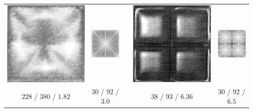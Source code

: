 \documentclass[compress,12pt]{beamer}
\begin{document}
\begin{frame}
  \tiny
  \begin{tabular}{ccccc} \\
    
    \includegraphics[width=.2\textwidth]{figures/1cell_exp} &
    \includegraphics[width=.2\textwidth]{figures/1cell_AR3} &
    \hspace{.05\textwidth} &
    \includegraphics[width=.2\textwidth]{figures/4cell_exp} &
    \includegraphics[width=.2\textwidth]{figures/4cell_AR6point5} \\
    
    $228$ / $380$ / $1.82$ &
    $30$  / $92$  / $3.0$ &
    & %
    $38$ / $93$ / $6.36$ &
    $30$  / $92$  / $6.5$ \\


\end{tabular}
\end{frame}
\end{document}
